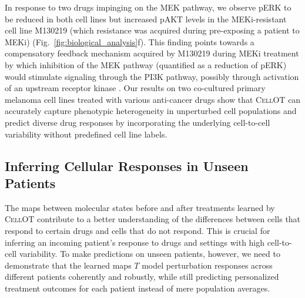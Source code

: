  In response to two drugs impinging on the MEK pathway, we observe pERK to be reduced in both cell lines but increased pAKT levels in the MEKi-resistant cell line M130219 (which resistance was acquired during pre-exposing a patient to MEKi) (Fig.~\ref{fig:biological_analysis}f). This finding points towards a compensatory feedback mechanism acquired by M130219 during MEKi treatment by which inhibition of the MEK pathway (quantified as a reduction of pERK) would stimulate signaling through the PI3K pathway, possibly through activation of an upstream receptor kinase \citep{caunt2015mek1}. 
Our results on two co-cultured primary melanoma cell lines treated with various anti-cancer drugs show that \textsc{CellOT} can accurately capture phenotypic heterogeneity in unperturbed cell populations and predict diverse drug responses by incorporating the underlying cell-to-cell variability without predefined cell line labels. 


\subsection{Inferring Cellular Responses in Unseen Patients}
The maps between molecular states before and after treatments learned by \textsc{CellOT} contribute to a better understanding of the differences between cells that respond to certain drugs and cells that do not respond. This is crucial for inferring an incoming patient's response to drugs and settings with high cell-to-cell variability.
To make predictions on unseen patients, however, we need to demonstrate that the learned maps $T$ model perturbation responses across different patients coherently and robustly, while still predicting personalized treatment outcomes for each patient instead of mere population averages.

